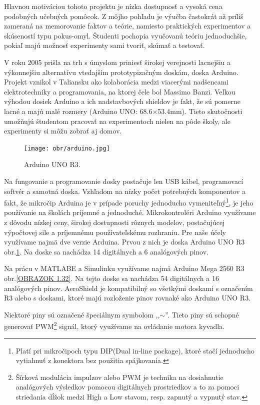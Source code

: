 Hlavnou motiváciou tohoto projektu je nízka dostupnosť a vysoká cena podobných učebných pomôcok. Z môjho pohľadu je výučba častokrát až príliš zameraná na memorovanie faktov a teórie, namiesto praktických experimentov a skúseností typu pokus-omyl. Študenti pochopia vyučovanú teóriu jednoduchšie, pokiaľ majú možnosť experimenty sami tvoriť, skúmať a testovať\cite{Dhanapal2013ASO}. 

V roku 2005 prišla na trh s úmyslom priniesť širokej verejnosti lacnejšiu a výkonnejšiu alternatívu vtedajším prototypizačným doskám\cite{stamp}, doska Arduino. Projekt vznikol v Taliansku ako kolaborácia medzi viacerými nadšencami elektrotechniky a programovania, na ktorej čele bol Massimo Banzi. Veľkou výhodou dosiek Arduino a ich nadstavbových shieldov je fakt, že sú pomerne lacné a majú malé rozmery (Arduino UNO: 68.6$\times$53.4mm\cite{UNO}). Tieto skutočnosti umožňujú študentom pracovať na experimentoch nielen na pôde školy, ale experimenty si môžu zobrať aj domov. 

\begin{figure}[!tbh]
	\centering
	\texttt{[image: obr/arduino.jpg]}
	\caption{{Arduino UNO R3\cite{UNOFOTO}.}}\label{OBRAZOK 1.3}
\end{figure}

Na fungovanie a programovanie dosky postačuje len USB kábel, programovací softvér a samotná doska. Vzhľadom na nízky počet potrebných komponentov a fakt, že mikročip Arduina je v prípade poruchy jednoducho vymeniteľný\footnote[2]{Platí pri mikročipoch typu DIP(Dual in-line package), ktoré stačí jednoducho vytiahnuť z konektora bez použitia spájkovania.}, je jeho používanie na školách príjemné a jednoduché. Mikrokontroléri Arduino využívame z dôvodu nízkej ceny, širokej dostupnosti rôznych modelov, postačujúcej výpočtovej sile a príjemnému používateľskému rozhraniu. Pre naše účely využívame najmä dve verzie Arduina. Prvou z nich je doska Arduino UNO R3  obr.\ref{OBRAZOK 1.3}. Na doske sa nachádza 14 digitálnych a 6 analógových pinov.

Na prácu v MATLABE a Simulinku využívame najmä Arduino Mega 2560 R3 obr.\ref{OBRAZOK 1.32}. Na tejto doske sa nachádza 54 digitálnych a 16 analógových pinov. AeroShield je kompatibilný so všetkými doskami s označením R3 alebo s doskami, ktoré majú rozloženie pinov rovnaké ako Arduino UNO R3. 


Niektoré piny sú označené špeciálnym symbolom ,,$\sim$''. Tieto piny sú schopné generovať PWM\footnote[3]{Šírková modulácia impulzov alebo PWM je technika na dosiahnutie analógových výsledkov pomocou digitálnych prostriedkov a to za pomoci striedania dĺžok medzi High a Low stavom, resp. zapnutý a vypnutý stav.} signál, ktorý využívame na ovládanie motora kyvadla.


